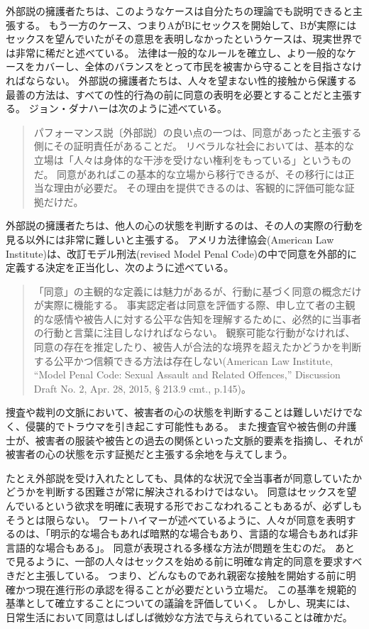\documentclass[paper=a4,book,openany]{jlreq}
\begin{document}
外部説の擁護者たちは、このようなケースは自分たちの理論でも説明できると主張する。
もう一方のケース、つまりAがBにセックスを開始して、Bが実際にはセックスを望んでいたがその意思を表明しなかったというケースは、現実世界では非常に稀だと述べている。
法律は一般的なルールを確立し、より一般的なケースをカバーし、全体のバランスをとって市民を被害から守ることを目指さなければならない。
外部説の擁護者たちは、人々を望まない性的接触から保護する最善の方法は、すべての性的行為の前に同意の表明を必要とすることだと主張する。
ジョン・ダナハーは次のように述べている。

\begin{quote}
  パフォーマンス説〔外部説〕の良い点の一つは、同意があったと主張する側にその証明責任があることだ。
リベラルな社会においては、基本的な立場は「人々は身体的な干渉を受けない権利をもっている」というものだ。
同意があればこの基本的な立場から移行できるが、その移行には正当な理由が必要だ。
その理由を提供できるのは、客観的に評価可能な証拠だけだ。
\citep{danaher13:_some_notes_consen_sexual_offen_part_one}
\end{quote}

外部説の擁護者たちは、他人の心の状態を判断するのは、その人の実際の行動を見る以外には非常に難しいと主張する。
アメリカ法律協会(American Law Institute)は、改訂モデル刑法(revised Model Penal Code)の中で同意を外部的に定義する決定を正当化し、次のように述べている。

\begin{quote}
「同意」の主観的な定義には魅力があるが、行動に基づく同意の概念だけが実際に機能する。
事実認定者は同意を評価する際、申し立て者の主観的な感情や被告人に対する公平な告知を理解するために、必然的に当事者の行動と言葉に注目しなければならない。
観察可能な行動がなければ、同意の存在を推定したり、被告人が合法的な境界を超えたかどうかを判断する公平かつ信頼できる方法は存在しない(American Law  Institute, ``Model Penal Code: Sexual Assault and Related Offences,'' Discussion Draft No. 2, Apr. 28, 2015, § 213.9 cmt., p.145)。
\end{quote}

捜査や裁判の文脈において、被害者の心の状態を判断することは難しいだけでなく、侵襲的でトラウマを引き起こす可能性もある。
また捜査官や被告側の弁護士が、被害者の服装や被告との過去の関係といった文脈的要素を指摘し、それが被害者の心の状態を示す証拠だと主張する余地を与えてしまう。

たとえ外部説を受け入れたとしても、具体的な状況で全当事者が同意していたかどうかを判断する困難さが常に解決されるわけではない。
同意はセックスを望んでいるという欲求を明確に表現する形でおこなわれることもあるが、必ずしもそうとは限らない。
ワートハイマーが述べているように、人々が同意を表明するのは、「明示的な場合もあれば暗黙的な場合もあり、言語的な場合もあれば非言語的な場合もある」\citep[p.346]{wertheimer03:_consen_sexual_relat}。
同意が表現される多様な方法が問題を生むのだ。
あとで見るように、一部の人々はセックスを始める前に明確な肯定的同意を要求すべきだと主張している。
つまり、どんなものであれ親密な接触を開始する前に明確かつ現在進行形の承認を得ることが必要だという立場だ。
この基準を規範的基準として確立することについての議論を評価していく。
しかし、現実には、日常生活において同意はしばしば微妙な方法で与えられていることは確かだ。
\end{document}
